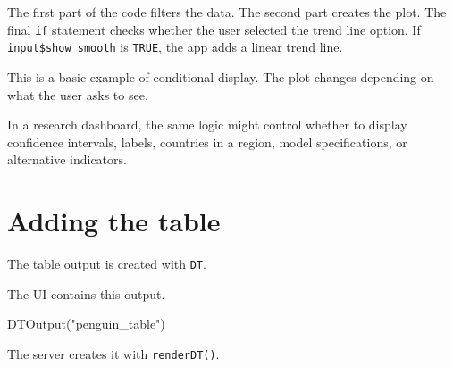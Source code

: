 \documentclass[
  letterpaper,
  DIV=11,
  numbers=noendperiod]{scrreprt}
\newenvironment{Shaded}{\begin{snugshade}}{\end{snugshade}}
\newcommand{\AttributeTok}[1]{\textcolor[rgb]{0.40,0.45,0.13}{#1}}
\newcommand{\ConstantTok}[1]{\textcolor[rgb]{0.56,0.35,0.01}{#1}}
\newcommand{\ControlFlowTok}[1]{\textcolor[rgb]{0.00,0.23,0.31}{\textbf{#1}}}
\newcommand{\DecValTok}[1]{\textcolor[rgb]{0.68,0.00,0.00}{#1}}
\newcommand{\FunctionTok}[1]{\textcolor[rgb]{0.28,0.35,0.67}{#1}}
\newcommand{\NormalTok}[1]{\textcolor[rgb]{0.00,0.23,0.31}{#1}}
\newcommand{\OtherTok}[1]{\textcolor[rgb]{0.00,0.23,0.31}{#1}}
\newcommand{\SpecialCharTok}[1]{\textcolor[rgb]{0.37,0.37,0.37}{#1}}
\newcommand{\StringTok}[1]{\textcolor[rgb]{0.13,0.47,0.30}{#1}}
\begin{document}
The first part of the code filters the data. The second part creates the
plot. The final \texttt{if} statement checks whether the user selected
the trend line option. If \texttt{input\$show\_smooth} is \texttt{TRUE},
the app adds a linear trend line.

This is a basic example of conditional display. The plot changes
depending on what the user asks to see.

In a research dashboard, the same logic might control whether to display
confidence intervals, labels, countries in a region, model
specifications, or alternative indicators.

\section{Adding the table}\label{adding-the-table}

The table output is created with \texttt{DT}.

The UI contains this output.

\begin{Shaded}
\begin{Highlighting}[]
\FunctionTok{DTOutput}\NormalTok{(}\StringTok{"penguin\_table"}\NormalTok{)}
\end{Highlighting}
\end{Shaded}

The server creates it with \texttt{renderDT()}.

\begin{Shaded}
\end{Shaded}
\end{document}
